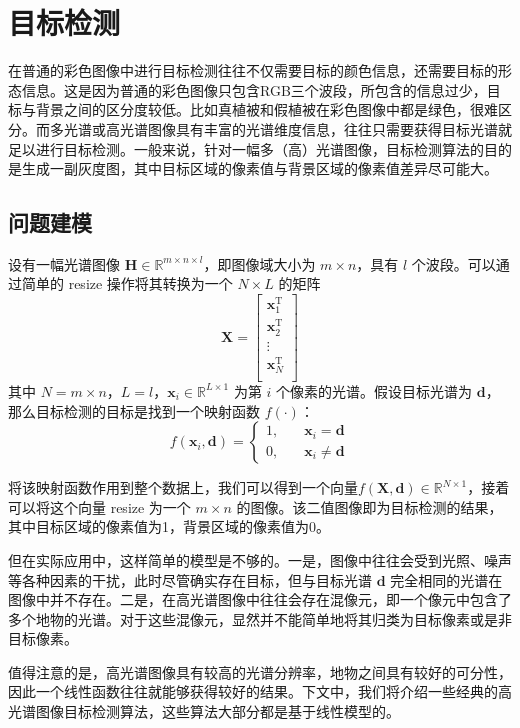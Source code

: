 \section{目标检测}
在普通的彩色图像中进行目标检测往往不仅需要目标的颜色信息，还需要目标的形态信息。这是因为普通的彩色图像只包含RGB三个波段，所包含的信息过少，目标与背景之间的区分度较低。比如真植被和假植被在彩色图像中都是绿色，很难区分。而多光谱或高光谱图像具有丰富的光谱维度信息，往往只需要获得目标光谱就足以进行目标检测。一般来说，针对一幅多（高）光谱图像，目标检测算法的目的是生成一副灰度图，其中目标区域的像素值与背景区域的像素值差异尽可能大。

\subsection{问题建模}
设有一幅光谱图像 \(\mathbf{H} \in \mathbb{R}^{m \times n \times l}\)，即图像域大小为 \(m\times n\)，具有 \(l\) 个波段。可以通过简单的 resize 操作将其转换为一个 \(N \times L\) 的矩阵
\[
    \mathbf{X} = \begin{bmatrix}
        \bm{x}_{1}^{\mathrm{T}} \\
        \bm{x}_{2}^{\mathrm{T}} \\
        \vdots                  \\
        \bm{x}_{N}^{\mathrm{T}} \\
    \end{bmatrix}
\]
其中 \(N=m \times n\)，\(L=l\)，\(\bm{x}_{i} \in \mathbb{R}^{L \times 1}\) 为第 \(i\) 个像素的光谱。假设目标光谱为 \(\bm{d}\)，那么目标检测的目标是找到一个映射函数 \(f(\cdot)\)：
\[
    f(\bm{x}_{i}, \bm{d}) = \left\{
    \begin{aligned}
        1, & \quad \bm{x}_{i} = \bm{d}    \\
        0, & \quad \bm{x}_{i} \neq \bm{d}
    \end{aligned} \right.
\]

将该映射函数作用到整个数据上，我们可以得到一个向量\(f(\mathbf{X}, \bm{d}) \in \mathbb{R}^{N \times 1}\)，接着可以将这个向量 resize 为一个 \(m \times n\) 的图像。该二值图像即为目标检测的结果，其中目标区域的像素值为1，背景区域的像素值为0。

但在实际应用中，这样简单的模型是不够的。一是，图像中往往会受到光照、噪声等各种因素的干扰，此时尽管确实存在目标，但与目标光谱 \(\bm{d}\) 完全相同的光谱在图像中并不存在。二是，在高光谱图像中往往会存在混像元，即一个像元中包含了多个地物的光谱。对于这些混像元，显然并不能简单地将其归类为目标像素或是非目标像素。

值得注意的是，高光谱图像具有较高的光谱分辨率，地物之间具有较好的可分性，因此一个线性函数往往就能够获得较好的结果。下文中，我们将介绍一些经典的高光谱图像目标检测算法，这些算法大部分都是基于线性模型的。

